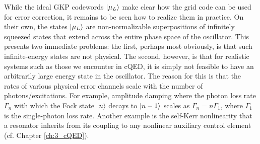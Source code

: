 While the ideal GKP codewords $\lvert\mu_L\rangle$ make clear how the grid code can be used for error correction, it remains to be seen how to realize them in practice. On their own, the states $\lvert\mu_L\rangle$ are non-normalizable superpositions of infinitely squeezed states that extend across the entire phase space of the oscillator. This presents two immediate problems: the first, perhaps most obviously, is that such infinite-energy states are not physical. The second, however, is that for realistic systems such as those we encounter in cQED, it is simply not feasible to have an arbitrarily large energy state in the oscillator. The reason for this is that the rates of various physical error channels scale with the number of photons/excitations. For example, amplitude damping where the photon loss rate $\Gamma_n$ with which the Fock state $\lvert n\rangle$ decays to $\lvert n-1\rangle$ scales as $\Gamma_n = n\Gamma_1$, where $\Gamma_1$ is the single-photon loss rate. Another example is the self-Kerr nonlinearity that a resonator inherits from its coupling to any nonlinear auxiliary control element (cf. Chapter \ref{ch:3_cQED}). 

